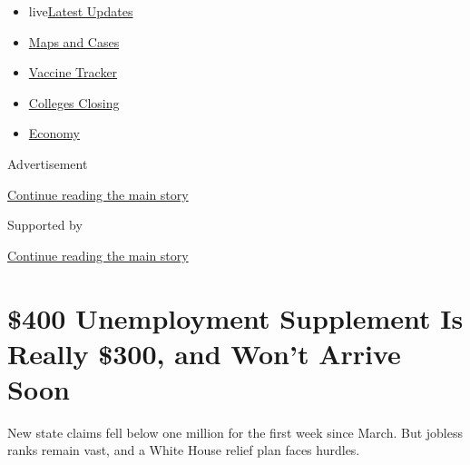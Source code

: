 \begin{itemize}
\tightlist
\item
  live\href{https://www.nytimes3xbfgragh.onion/2020/08/20/world/coronavirus-covid.html?name=styln-coronavirus-markets\&region=TOP_BANNER\&variant=undefined\&block=storyline_menu_recirc\&action=click\&pgtype=Article\&impression_id=61565bb1-e380-11ea-9fe8-6ddc6eaba552}{Latest
  Updates}
\item
  \href{https://www.nytimes3xbfgragh.onion/interactive/2020/us/coronavirus-us-cases.html?name=styln-coronavirus-markets\&region=TOP_BANNER\&variant=undefined\&block=storyline_menu_recirc\&action=click\&pgtype=Article\&impression_id=61565bb2-e380-11ea-9fe8-6ddc6eaba552}{Maps
  and Cases}
\item
  \href{https://www.nytimes3xbfgragh.onion/interactive/2020/science/coronavirus-vaccine-tracker.html?name=styln-coronavirus-markets\&region=TOP_BANNER\&variant=undefined\&block=storyline_menu_recirc\&action=click\&pgtype=Article\&impression_id=61565bb3-e380-11ea-9fe8-6ddc6eaba552}{Vaccine
  Tracker}
\item
  \href{https://www.nytimes3xbfgragh.onion/2020/08/19/us/colleges-closing-covid.html?name=styln-coronavirus-markets\&region=TOP_BANNER\&variant=undefined\&block=storyline_menu_recirc\&action=click\&pgtype=Article\&impression_id=61565bb4-e380-11ea-9fe8-6ddc6eaba552}{Colleges
  Closing}
\item
  \href{https://www.nytimes3xbfgragh.onion/live/2020/08/20/business/stock-market-today-coronavirus?name=styln-coronavirus-markets\&region=TOP_BANNER\&variant=undefined\&block=storyline_menu_recirc\&action=click\&pgtype=Article\&impression_id=61565bb5-e380-11ea-9fe8-6ddc6eaba552}{Economy}
\end{itemize}

Advertisement

\protect\hyperlink{after-top}{Continue reading the main story}

Supported by

\protect\hyperlink{after-sponsor}{Continue reading the main story}

\hypertarget{400-unemployment-supplement-is-really-300-and-wont-arrive-soon}{%
\section{\$400 Unemployment Supplement Is Really \$300, and Won't Arrive
Soon}\label{400-unemployment-supplement-is-really-300-and-wont-arrive-soon}}

New state claims fell below one million for the first week since March.
But jobless ranks remain vast, and a White House relief plan faces
hurdles.

